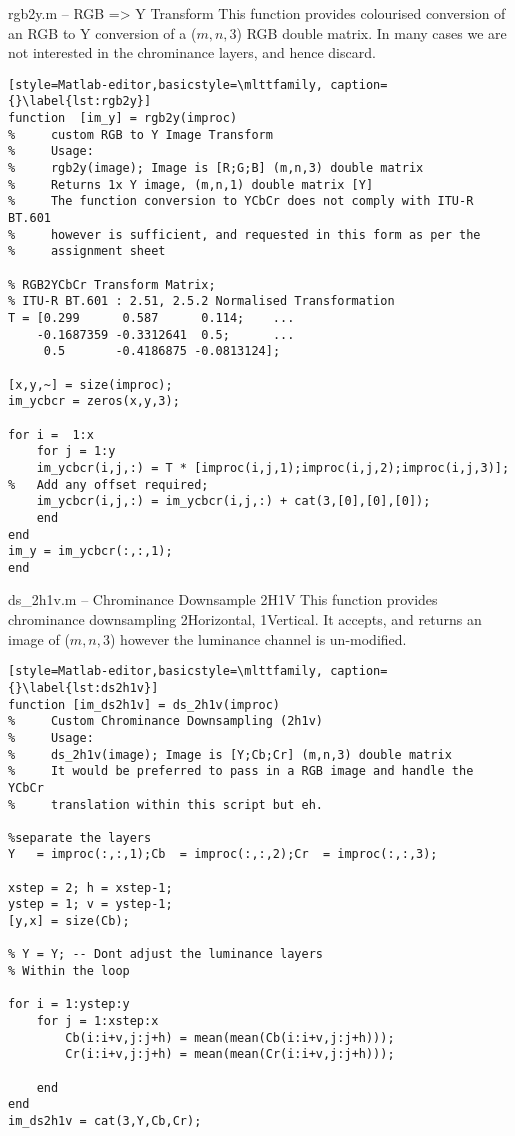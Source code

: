 \begin{codeblock}{rgb2y.m -- RGB => Y Transform}
    This function provides colourised conversion of an RGB to Y conversion of a ($m,n,3$) RGB double matrix. In many cases we are not interested in the chrominance layers, and hence discard.

        
    \begin{lstlisting}[style=Matlab-editor,basicstyle=\mlttfamily, caption={}\label{lst:rgb2y}]
function  [im_y] = rgb2y(improc)
%     custom RGB to Y Image Transform
%     Usage:
%     rgb2y(image); Image is [R;G;B] (m,n,3) double matrix
%     Returns 1x Y image, (m,n,1) double matrix [Y]
%     The function conversion to YCbCr does not comply with ITU-R BT.601
%     however is sufficient, and requested in this form as per the 
%     assignment sheet

% RGB2YCbCr Transform Matrix;
% ITU-R BT.601 : 2.51, 2.5.2 Normalised Transformation 
T = [0.299      0.587      0.114;    ...
    -0.1687359 -0.3312641  0.5;      ...
     0.5       -0.4186875 -0.0813124]; 

[x,y,~] = size(improc);
im_ycbcr = zeros(x,y,3);

for i =  1:x
    for j = 1:y
    im_ycbcr(i,j,:) = T * [improc(i,j,1);improc(i,j,2);improc(i,j,3)];
%   Add any offset required; 
    im_ycbcr(i,j,:) = im_ycbcr(i,j,:) + cat(3,[0],[0],[0]); 
    end
end
im_y = im_ycbcr(:,:,1);
end
\end{lstlisting}
\end{codeblock}
\clearpage

\begin{codeblock}{ds\_2h1v.m -- Chrominance Downsample 2H1V}
    This function provides chrominance downsampling 2Horizontal, 1Vertical. It accepts, and returns an image of ($m,n,3$) however the luminance channel is un-modified.
        
    \begin{lstlisting}[style=Matlab-editor,basicstyle=\mlttfamily, caption={}\label{lst:ds2h1v}]
function [im_ds2h1v] = ds_2h1v(improc)
%     Custom Chrominance Downsampling (2h1v)
%     Usage:
%     ds_2h1v(image); Image is [Y;Cb;Cr] (m,n,3) double matrix
%     It would be preferred to pass in a RGB image and handle the YCbCr
%     translation within this script but eh.

%separate the layers
Y   = improc(:,:,1);Cb  = improc(:,:,2);Cr  = improc(:,:,3); 

xstep = 2; h = xstep-1;
ystep = 1; v = ystep-1;
[y,x] = size(Cb);

% Y = Y; -- Dont adjust the luminance layers
% Within the loop

for i = 1:ystep:y
    for j = 1:xstep:x
        Cb(i:i+v,j:j+h) = mean(mean(Cb(i:i+v,j:j+h)));
        Cr(i:i+v,j:j+h) = mean(mean(Cr(i:i+v,j:j+h)));

    end
end
im_ds2h1v = cat(3,Y,Cb,Cr);


    \end{lstlisting}
\end{codeblock}

